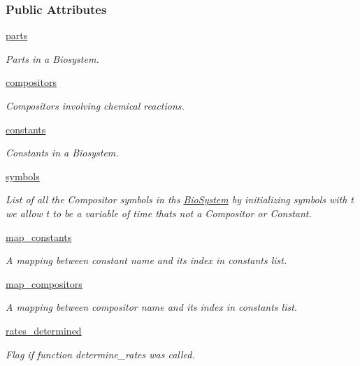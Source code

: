 \subsubsection*{Public Attributes}
\begin{DoxyCompactItemize}
\item 
\hyperlink{classBiosystem_1_1BioSystem_adc4002931a29601944a3e11191af7707}{parts}
\begin{DoxyCompactList}\small\item\em Parts in a Biosystem. \end{DoxyCompactList}\item 
\hyperlink{classBiosystem_1_1BioSystem_a1ea37fee07cb448e6833f7b9ab23d38a}{compositors}
\begin{DoxyCompactList}\small\item\em Compositors involving chemical reactions. \end{DoxyCompactList}\item 
\hyperlink{classBiosystem_1_1BioSystem_a849a36fc85493e2cc1798d7fd99a2771}{constants}
\begin{DoxyCompactList}\small\item\em Constants in a Biosystem. \end{DoxyCompactList}\item 
\hyperlink{classBiosystem_1_1BioSystem_a4a04b16611692fee47542e344d7a332d}{symbols}
\begin{DoxyCompactList}\small\item\em List of all the Compositor symbols in ths \hyperlink{classBiosystem_1_1BioSystem}{Bio\+System} by initializing symbols with t we allow t to be a variable of time that\textquotesingle{}s not a Compositor or Constant. \end{DoxyCompactList}\item 
\hyperlink{classBiosystem_1_1BioSystem_a0b7ed650ff3a0db588b21d55151fbee6}{map\+\_\+constants}
\begin{DoxyCompactList}\small\item\em A mapping between constant name and its index in {\ttfamily constants} list. \end{DoxyCompactList}\item 
\hyperlink{classBiosystem_1_1BioSystem_a927092fec3432044b77b39e106a75a40}{map\+\_\+compositors}
\begin{DoxyCompactList}\small\item\em A mapping between compositor name and its index in {\ttfamily constants} list. \end{DoxyCompactList}\item 
\hyperlink{classBiosystem_1_1BioSystem_a9189d6eb1e1965d9b63cda27e53f08b7}{rates\+\_\+determined}
\begin{DoxyCompactList}\small\item\em Flag if function determine\+\_\+rates was called. \end{DoxyCompactList}\end{DoxyCompactItemize}


